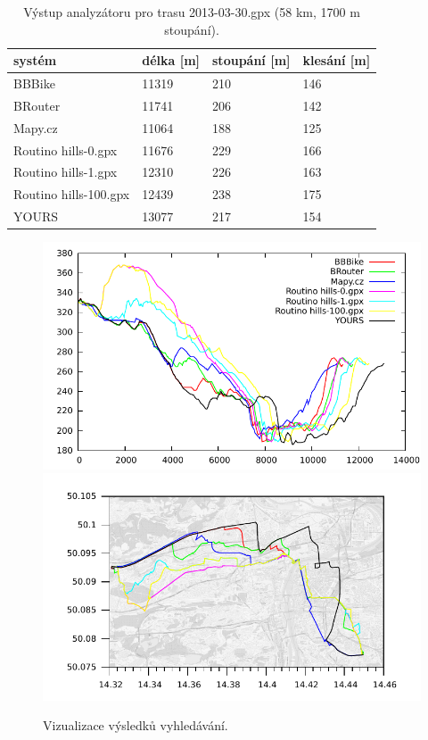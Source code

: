 \documentclass[thesis=B,czech]{FITthesis}[2012/06/26]
\begin{document}
\begin{table}[h!]
\begin{tabular}{l|l|l|l} %
\textbf{systém}	&	\textbf{délka [m]}	&	\textbf{stoupání [m]}	&	\textbf{klesání [m]}	\\
\hline
BBBike	&	11319 & 210	&	146	 \\
BRouter	&	11741 & 206	&	142	 \\
Mapy.cz	&	11064 & 188	&	125	 \\
Routino hills-0.gpx	&	11676 & 229	&	166	 \\
Routino hills-1.gpx	&	12310 & 226	&	163	 \\
Routino hills-100.gpx	&	12439 & 238	&	175	 \\
YOURS	&	13077 & 217	&	154	 \\

\end{tabular}
\caption{Výstup analyzátoru pro trasu 2013-03-30.gpx (58 km, 1700 m stoupání).}
\label{table:vystupAnalyzatoru}
\end{table}


\begin{figure}[!ht]
\centering
\includegraphics[width=\columnwidth]{porovnani/ele-z.pdf}
\includegraphics[width=\columnwidth]{porovnani/ll-z.pdf}

\caption{Vizualizace výsledků vyhledávání. }
\label{img:hledani-h}
\end{figure}
\end{document}

